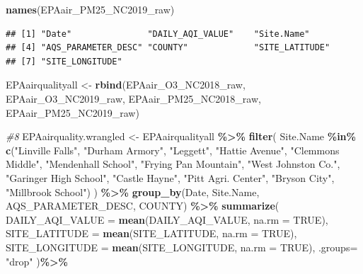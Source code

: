 \documentclass[
]{article}
\newenvironment{Shaded}{\begin{snugshade}}{\end{snugshade}}
\newcommand{\AttributeTok}[1]{\textcolor[rgb]{0.13,0.29,0.53}{#1}}
\newcommand{\CommentTok}[1]{\textcolor[rgb]{0.56,0.35,0.01}{\textit{#1}}}
\newcommand{\ConstantTok}[1]{\textcolor[rgb]{0.56,0.35,0.01}{#1}}
\newcommand{\FunctionTok}[1]{\textcolor[rgb]{0.13,0.29,0.53}{\textbf{#1}}}
\newcommand{\NormalTok}[1]{#1}
\newcommand{\OtherTok}[1]{\textcolor[rgb]{0.56,0.35,0.01}{#1}}
\newcommand{\SpecialCharTok}[1]{\textcolor[rgb]{0.81,0.36,0.00}{\textbf{#1}}}
\newcommand{\StringTok}[1]{\textcolor[rgb]{0.31,0.60,0.02}{#1}}
\begin{document}
\begin{Shaded}
\begin{Highlighting}[]
\FunctionTok{names}\NormalTok{(EPAair\_PM25\_NC2019\_raw)}
\end{Highlighting}
\end{Shaded}

\begin{verbatim}
## [1] "Date"               "DAILY_AQI_VALUE"    "Site.Name"         
## [4] "AQS_PARAMETER_DESC" "COUNTY"             "SITE_LATITUDE"     
## [7] "SITE_LONGITUDE"
\end{verbatim}

\begin{Shaded}
\begin{Highlighting}[]
\NormalTok{EPAairqualityall }\OtherTok{\textless{}{-}} \FunctionTok{rbind}\NormalTok{(EPAair\_O3\_NC2018\_raw, }
\NormalTok{      EPAair\_O3\_NC2019\_raw,}
\NormalTok{      EPAair\_PM25\_NC2018\_raw, }
\NormalTok{      EPAair\_PM25\_NC2019\_raw)}

\CommentTok{\#8 }
\NormalTok{EPAairquality.wrangled }\OtherTok{\textless{}{-}}\NormalTok{ EPAairqualityall }\SpecialCharTok{\%\textgreater{}\%}
  \FunctionTok{filter}\NormalTok{( Site.Name }\SpecialCharTok{\%in\%} 
            \FunctionTok{c}\NormalTok{(}\StringTok{"Linville Falls"}\NormalTok{, }\StringTok{"Durham Armory"}\NormalTok{, }\StringTok{"Leggett"}\NormalTok{, }\StringTok{"Hattie Avenue"}\NormalTok{,  }
                     \StringTok{"Clemmons Middle"}\NormalTok{, }\StringTok{"Mendenhall School"}\NormalTok{, }\StringTok{"Frying Pan Mountain"}\NormalTok{, }
                     \StringTok{"West Johnston Co."}\NormalTok{, }\StringTok{"Garinger High School"}\NormalTok{, }\StringTok{"Castle Hayne"}\NormalTok{, }
                     \StringTok{"Pitt Agri. Center"}\NormalTok{, }\StringTok{"Bryson City"}\NormalTok{, }\StringTok{"Millbrook School"}\NormalTok{)}
\NormalTok{  ) }\SpecialCharTok{\%\textgreater{}\%}
  \FunctionTok{group\_by}\NormalTok{(Date, Site.Name, AQS\_PARAMETER\_DESC, COUNTY) }\SpecialCharTok{\%\textgreater{}\%}
 \FunctionTok{summarize}\NormalTok{(}
  \AttributeTok{DAILY\_AQI\_VALUE =} \FunctionTok{mean}\NormalTok{(DAILY\_AQI\_VALUE, }\AttributeTok{na.rm =} \ConstantTok{TRUE}\NormalTok{),}
  \AttributeTok{SITE\_LATITUDE   =} \FunctionTok{mean}\NormalTok{(SITE\_LATITUDE, }\AttributeTok{na.rm =} \ConstantTok{TRUE}\NormalTok{),}
  \AttributeTok{SITE\_LONGITUDE  =} \FunctionTok{mean}\NormalTok{(SITE\_LONGITUDE, }\AttributeTok{na.rm =} \ConstantTok{TRUE}\NormalTok{),}
  \AttributeTok{.groups=} \StringTok{"drop"} 
\NormalTok{  )}\SpecialCharTok{\%\textgreater{}\%}
  

\end{Highlighting}
\end{Shaded}
\end{document}

